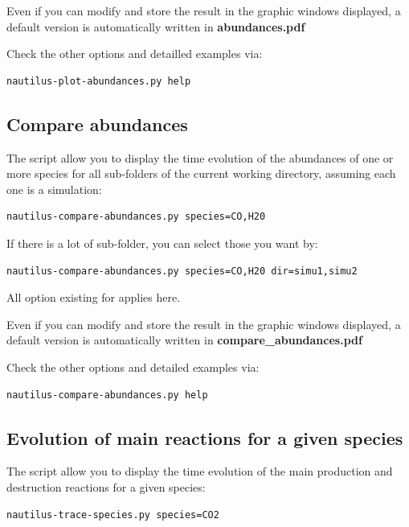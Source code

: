 \documentclass[english,a4paper,twoside]{article}
\begin{document}
Even if you can modify and store the result in the graphic windows displayed, a default version is automatically written in \textbf{abundances.pdf} 

Check the other options and detailled examples via:
\begin{verbatim}
nautilus-plot-abundances.py help
\end{verbatim}

\subsection{Compare abundances}
The script  allow you to display the time evolution of the abundances of one or more species for all sub-folders of the current working directory, assuming each one is a simulation:
\begin{verbatim}
nautilus-compare-abundances.py species=CO,H20
\end{verbatim}

If there is a lot of sub-folder, you can select those you want by:
\begin{verbatim}
nautilus-compare-abundances.py species=CO,H20 dir=simu1,simu2
\end{verbatim}

All option existing for  applies here.

Even if you can modify and store the result in the graphic windows displayed, a default version is automatically written in \textbf{compare\_abundances.pdf} 

Check the other options and detailed examples via:
\begin{verbatim}
nautilus-compare-abundances.py help
\end{verbatim}

\subsection{Evolution of main reactions for a given species}\label{sec:trace-species}
The script  allow you to display the time evolution of the main production and destruction reactions for a given species:
\begin{verbatim}
nautilus-trace-species.py species=CO2
\end{verbatim}
\end{document}
